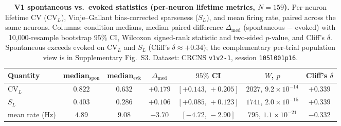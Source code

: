 \documentclass[11pt]{article}
\theoremstyle{remark}
\theoremstyle{definition}
\begin{document}
\begin{table}[h!]
\centering
\caption{\textbf{V1 spontaneous vs.\ evoked statistics (per-neuron lifetime metrics, $N=159$).}  Per-neuron lifetime CV ($\mathrm{CV}_L$), Vinje--Gallant bias-corrected sparseness ($S_L$), and mean firing rate, paired across the same neurons.  Columns: condition medians, median paired difference $\Delta_{\mathrm{med}}$ (spontaneous $-$ evoked) with 10{,}000-resample bootstrap $95\%$ CI, Wilcoxon signed-rank statistic and two-sided $p$-value, and Cliff's $\delta$.  Spontaneous exceeds evoked on $\mathrm{CV}_L$ and $S_L$ (Cliff's $\delta\approx +0.34$); the complementary per-trial population view is in Supplementary Fig.~S3.  Dataset: CRCNS \texttt{v1v2-1}, session \texttt{105l001p16}.}
\begin{tabular}{lcccccc}
\toprule
Quantity & median$_{\mathrm{spon}}$ & median$_{\mathrm{evk}}$ & $\Delta_{\mathrm{med}}$ & $95\%$ CI & $W$, $p$ & Cliff's $\delta$ \\
\midrule
$\mathrm{CV}_L$        & $0.822$  & $0.632$  & $+0.179$ & $[+0.143,\,+0.205]$ & $2027$, $9.2\!\times\!10^{-14}$ & $+0.339$ \\
$S_L$                  & $0.403$  & $0.286$  & $+0.106$ & $[+0.085,\,+0.123]$ & $1741$, $2.0\!\times\!10^{-15}$ & $+0.339$ \\
mean rate (Hz)         & $4.89$   & $9.08$   & $-3.70$  & $[-4.72,\,-2.90]$  & $795$,  $1.1\!\times\!10^{-21}$ & $-0.332$ \\
\bottomrule
\end{tabular}
\label{tab:fig2-stats}
\end{table}
\end{document}
